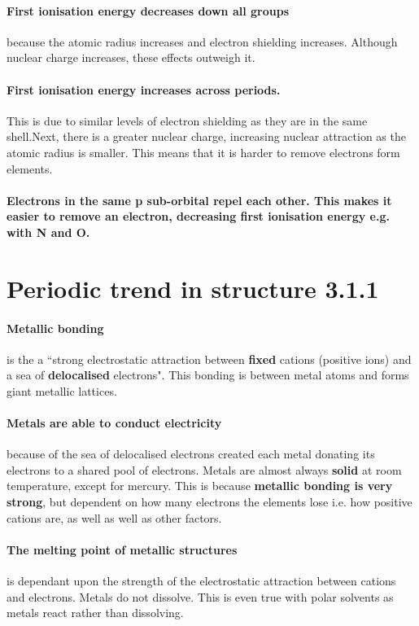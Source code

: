 \paragraph{First ionisation energy decreases down all groups}because the atomic radius increases and electron shielding increases. Although nuclear charge increases, these effects outweigh it. 
\paragraph{First ionisation energy increases across periods.}This is due to similar levels of electron shielding as they are in the same shell.Next, there is a greater nuclear charge, increasing nuclear attraction as the atomic radius is smaller. This means that it is harder to remove electrons form elements.
\paragraph{Electrons in the same p sub-orbital repel each other. This makes it easier to remove an electron, decreasing first ionisation energy e.g. with N and O.}
\section{Periodic trend in structure 3.1.1}
	
	\paragraph{Metallic bonding} is the a ``strong electrostatic attraction between \textbf{fixed} cations (positive ions) and a sea of \textbf{delocalised} electrons".
	This bonding is between metal atoms and forms giant metallic lattices.
	\paragraph{Metals are able to conduct electricity} because of the sea of delocalised electrons created each metal donating its electrons to a shared pool of electrons.
	Metals are almost always \textbf{solid} at room temperature, except for mercury.
	This is because \textbf{metallic bonding is very strong}, but dependent on how many electrons the elements lose i.e. how positive cations are, as well as well as other factors.
    \paragraph{The melting point of metallic structures} is dependant upon the strength of the electrostatic attraction between cations and electrons. 
    Metals do not dissolve. This is even true with polar solvents as metals react rather than dissolving.
	
